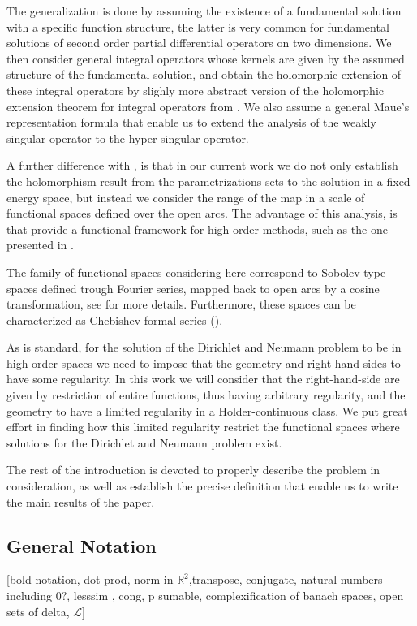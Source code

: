 \documentclass{article}
\newcommand{\todo}[1]{{\color{red}[#1]}}
\newcommand{\IR}{{\mathbb R}}
\begin{document}
The generalization is done by assuming the existence of a fundamental solution with a specific function structure, the latter is very common for  fundamental solutions of second order partial differential operators on two dimensions. We then consider general integral operators whose kernels are given by the assumed structure of the fundamental solution, and obtain the holomorphic extension of these integral operators by  slighly more abstract version of the holomorphic extension theorem for integral operators  from \cite[Theorem 3.12]{Henriquez2021}. We also assume a general Maue's representation formula that enable us to extend the analysis of the weakly singular operator to the hyper-singular operator. 

A further difference with \cite{Henriquez2021}, is that in our current work we do not only establish the holomorphism result from the parametrizations sets to the solution in a fixed energy space, but instead we consider the range of the map in a  scale of functional spaces defined over the open arcs. The advantage of this analysis, is that provide a functional  framework for high order methods, such as the one presented in \cite{JHP20}. 

The family of functional spaces considering here correspond to Sobolev-type spaces defined trough Fourier series, mapped back to open arcs by a cosine transformation, see  \cite[Chapter 11]{saranen2013periodic} for more details. Furthermore, these spaces can be characterized as Chebishev formal series (\cite{Averseng2019}). 

As is standard, for the solution of the Dirichlet and Neumann problem to be in high-order spaces we need to impose that the geometry and right-hand-sides  to have some regularity. In this work we will consider that the right-hand-side are given by restriction of entire functions, thus having arbitrary regularity, and the geometry to have a limited regularity in a Holder-continuous class. We put great effort in finding how this limited regularity restrict the functional spaces where solutions for the Dirichlet and Neumann problem exist. 

The rest of the introduction is devoted to properly describe the problem in consideration, as well as establish the precise definition that enable us to write the main results of the paper. 

\subsection{General Notation}
\todo{bold notation, dot prod, norm in $\IR^2$,transpose, conjugate, natural numbers including 0?, lesssim , cong, p sumable, complexification of banach spaces, open sets of delta, $\mathcal{L}$}
\end{document}
